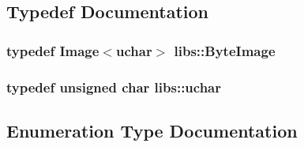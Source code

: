 \subsection{Typedef Documentation}
\hypertarget{namespacelibs_a16118b81f5f0fc54cea32159a5530299}{}
\subsubsection[{Byte\+Image}]{\setlength{\rightskip}{0pt plus 5cm}typedef {\bf Image}$<${\bf uchar}$>$ {\bf libs\+::\+Byte\+Image}}\label{namespacelibs_a16118b81f5f0fc54cea32159a5530299}
\hypertarget{namespacelibs_a90e2a46b7e02c762706ee6be80091c7a}{}
\subsubsection[{uchar}]{\setlength{\rightskip}{0pt plus 5cm}typedef unsigned char {\bf libs\+::uchar}}\label{namespacelibs_a90e2a46b7e02c762706ee6be80091c7a}


\subsection{Enumeration Type Documentation}
\hypertarget{namespacelibs_a85e30cf7dbcb94a3d5e3bd5caf31c752}{}
